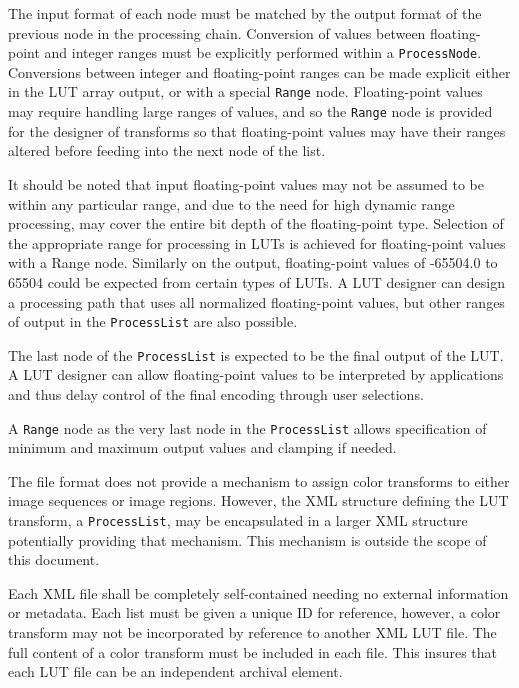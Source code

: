 
The input format of each node must be matched by the output format of the previous node in the processing chain. Conversion of values between floating-point and integer ranges must be explicitly performed within a \texttt{ProcessNode}. Conversions between integer and floating-point ranges can be made explicit either in the LUT array output, or with a special \texttt{Range} node. Floating-point values may require handling large ranges of values, and so the \texttt{Range} node is provided for the designer of transforms so that floating-point values may have their ranges altered before feeding into the next node of the list.

It should be noted that input floating-point values may not be assumed to be within any particular range, and due to the need for high dynamic range processing, may cover the entire bit depth of the floating-point type.  Selection of the appropriate range for processing in LUTs is achieved for floating-point values with a Range node. Similarly on the output, floating-point values of -65504.0 to 65504 could be expected from certain types of LUTs. A LUT designer can design a processing path that uses all normalized floating-point values, but other ranges of output in the \texttt{ProcessList} are also possible.

The last node of the \texttt{ProcessList} is expected to be the final output of the LUT. A LUT designer can allow floating-point values to be interpreted by applications and thus delay control of the final encoding through user selections. 

A \texttt{Range} node as the very last node in the \texttt{ProcessList} allows specification of minimum and maximum output values and clamping if needed.

The file format does not provide a mechanism to assign color transforms to either image sequences or image regions. However, the XML structure defining the LUT transform, a \texttt{ProcessList}, may be encapsulated in a larger XML structure potentially providing that mechanism. This mechanism is outside the scope of this document.

Each XML file shall be completely self-contained needing no external information or metadata. Each list must be given a unique ID for reference, however, a color transform may not be incorporated by reference to another XML LUT file. The full content of a color transform must be included in each file. This insures that each LUT file can be an independent archival element.

